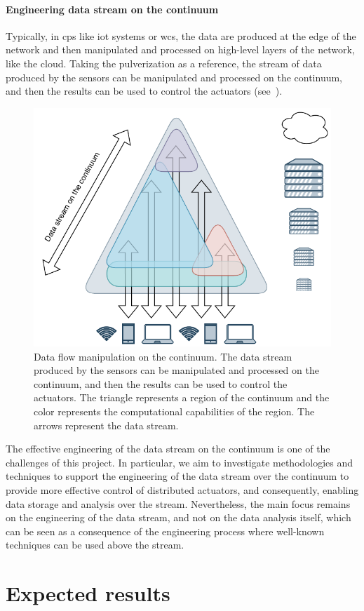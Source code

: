 \documentclass[12pt,a4paper]{article}
\begin{document}
\paragraph{Engineering data stream on the continuum}\label{sec:eng-data-stream}
Typically,
in \ac{cps} like \ac{iot} systems or \ac{wcs},
the data are produced at the edge of the network and then manipulated and processed on high-level layers of the network, like the cloud.
%
Taking the pulverization as a reference,
the stream of data produced by the sensors can be manipulated and processed on the continuum,
and then the results can be used to control the actuators (see~).
%
\begin{figure}[ht]
	\centering
	\includegraphics[width=.55\textwidth]{img/data-stream.drawio.pdf}
	\caption{
		Data flow manipulation on the continuum.
		The data stream produced by the sensors can be manipulated and processed on the continuum,
		and then the results can be used to control the actuators.
		The triangle represents a region of the continuum and the color represents the computational capabilities of the region.
		The arrows represent the data stream.
		}
	\label{fig:data-stream}
\end{figure}
%
The effective engineering of the data stream on the continuum is one of the challenges of this project.
%
In particular,
we aim to investigate methodologies and techniques to support the engineering of the data stream over the continuum to provide more effective control of distributed actuators,
and consequently,
enabling data storage and analysis over the stream.
%
Nevertheless,
the main focus remains on the engineering of the data stream,
and not on the data analysis itself,
which can be seen as a consequence of the engineering process where well-known techniques can be used above the stream.


\section{Expected results}\label{sec:expected-results}
\end{document}
